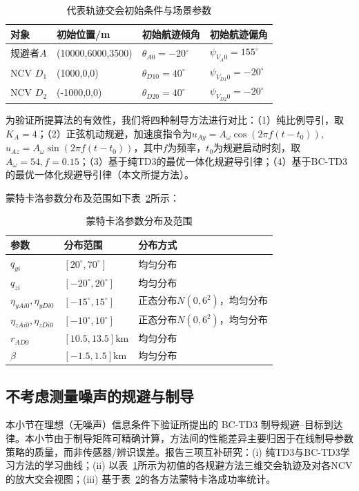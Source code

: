 \begin{table}[htbp]
\centering
\caption{代表轨迹交会初始条件与场景参数}
\label{tab:init-traj}
\small
\begin{tabularx}{\linewidth}{lXXX}
\toprule
对象 & 初始位置/m & 初始航迹倾角 & 初始航迹偏角 \\
\midrule
规避者$A$ & (10000,6000,3500) & ${\theta _{A0}} =  - {20^ \circ }$ & ${\psi _{{V_A}0}} = {155^ \circ }$ \\
NCV ${D_1}$ & (1000,0,0) & ${\theta _{D10}} = {40^ \circ }$ & ${\psi _{{V_{D1}}0}} =  - {20^ \circ }$ \\
NCV ${D_2}$ & (-1000,0,0) & ${\theta _{D20}} = {40^ \circ }$ & ${\psi _{{V_{D2}}0}} =  - {20^ \circ }$ \\
\bottomrule
\end{tabularx}
\end{table}
为验证所提算法的有效性，我们将四种制导方法进行对比：（1）纯比例导引，取${K_A} = 4$；（2）正弦机动规避，加速度指令为${u_{Ay}} = {A_\omega }\cos (2\pi f(t - {t_0}))$, ${u_{Az}} = {A_\omega }\sin (2\pi f(t - {t_0}))$，其中$f$为频率，${t_0}$为规避启动时刻，取${A_\omega } = 54,f = 0.15$；（3）基于纯TD3的最优一体化规避导引律；（4）基于BC-TD3的最优一体化规避导引律（本文所提方法）。

蒙特卡洛参数分布及范围如下表~\ref{tab:mc-dist}所示：

\begin{table}[htbp]
\centering
\caption{蒙特卡洛参数分布及范围}
\label{tab:mc-dist}
\small
\begin{tabularx}{\linewidth}{lXX}
\toprule
参数 & 分布范围 & 分布方式 \\
\midrule
${q_{yi}}$ & $[{20^ \circ },{70^ \circ }]$ & 均匀分布 \\
${q_{zi}}$ & $[ - {20^ \circ },{20^ \circ }]$ & 均匀分布 \\
${\eta _{yAi0}},{\eta _{yDi0}}$ & $[ - {15^ \circ },{15^ \circ }]$ & 正态分布$N(0,{6^2})$，均匀分布 \\
${\eta _{zAi0}},{\eta _{zDi0}}$ & $[ - {10^ \circ },{10^ \circ }]$ & 正态分布$N(0,{6^2})$，均匀分布 \\
${r_{AD0}}$ & $[10.5,13.5]{\text{km}}$ & 均匀分布 \\
$\beta $ & $[ - 1.5,1.5]{\text{km}}$ & 均匀分布 \\
\bottomrule
\end{tabularx}
\end{table}
\subsection{不考虑测量噪声的规避与制导}
本小节在理想（无噪声）信息条件下验证所提出的 BC-TD3 制导规避–目标到达律。本小节由于制导矩阵可精确计算，方法间的性能差异主要归因于在线制导参数策略的质量，而非传感器/辨识误差。报告三项互补研究：(i) 纯TD3与BC-TD3学习方法的学习曲线；(ii) 以表~\ref{tab:init-traj}所示为初值的各规避方法三维交会轨迹及对各NCV的放大交会视图；(iii) 基于表~\ref{tab:mc-dist}的各方法蒙特卡洛成功率统计。

